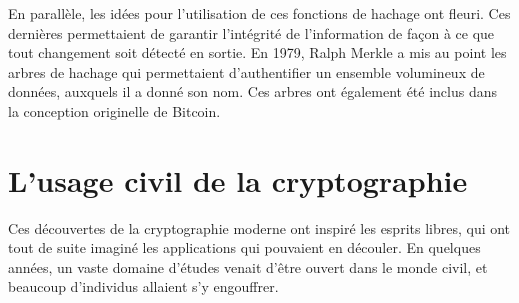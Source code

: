 En parallèle, les idées pour l'utilisation de ces fonctions de hachage ont fleuri. Ces dernières permettaient de garantir l'intégrité de l'information de façon à ce que tout changement soit détecté en sortie. En 1979, Ralph Merkle a mis au point les arbres de hachage qui permettaient d'authentifier un ensemble volumineux de données, auxquels il a donné son nom. Ces arbres ont également été inclus dans la conception originelle de Bitcoin.

\section*{L'usage civil de la cryptographie}


Ces découvertes de la cryptographie moderne ont inspiré les esprits libres, qui ont tout de suite imaginé les applications qui pouvaient en découler. En quelques années, un vaste domaine d'études venait d'être ouvert dans le monde civil, et beaucoup d'individus allaient s'y engouffrer.


